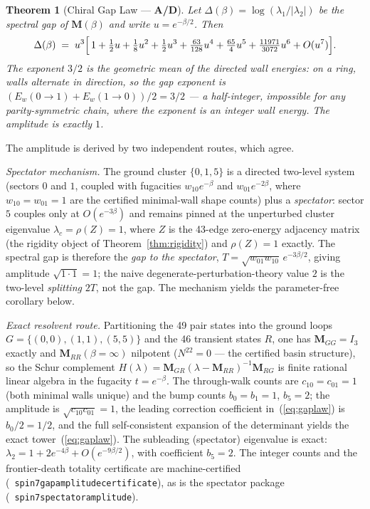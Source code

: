 \documentclass[11pt]{article}
\newtheorem{theorem}{Theorem}[section]
\theoremstyle{remark}
\newcommand{\lean}[1]{%
  \penalty-100
  \begingroup\def\_{\textunderscore\allowbreak}\texttt{#1}\endgroup}
\newcommand{\CatAD}{\textbf{A/D}}
\begin{document}
\begin{theorem}[Chiral Gap Law --- \CatAD{}]
\label{thm:gaplaw}
Let $\Delta(\beta) = \log(\lambda_1/|\lambda_2|)$ be the spectral gap of
$\mathbf{M}(\beta)$ and write $u = e^{-\beta/2}$. Then
\begin{equation}\label{eq:gaplaw}
  \Delta(\beta) \;=\; u^3 \Bigl[\, 1 + \tfrac{1}{2}u + \tfrac{1}{8}u^2
    + \tfrac{1}{2}u^3 + \tfrac{63}{128}u^4 + \tfrac{65}{4}u^5
    + \tfrac{11971}{3072}u^6 + O(u^7) \Bigr].
\end{equation}
The exponent $3/2$ is the geometric mean of the directed wall energies: on a
ring, walls alternate in direction, so the gap exponent is
$(E_w(0{\to}1) + E_w(1{\to}0))/2 = 3/2$ --- a half-integer, impossible for any
parity-symmetric chain, where the exponent is an integer wall energy. The
amplitude is exactly $1$.
\end{theorem}

The amplitude is derived by two independent routes, which agree.

\medskip
\noindent\emph{Spectator mechanism.}
The ground cluster $\{0, 1, 5\}$ is a directed two-level system (sectors $0$
and $1$, coupled with fugacities $w_{10}e^{-\beta}$ and $w_{01}e^{-2\beta}$,
where $w_{10} = w_{01} = 1$ are the certified minimal-wall shape counts) plus
a \emph{spectator}: sector $5$ couples only at $O(e^{-3\beta})$ and remains
pinned at the unperturbed cluster eigenvalue $\lambda_c = \rho(Z) = 1$, where
$Z$ is the 43-edge zero-energy adjacency matrix (the rigidity object of
Theorem~\ref{thm:rigidity}) and $\rho(Z) = 1$ exactly. The spectral gap is
therefore the \emph{gap to the spectator},
$T = \sqrt{w_{01} w_{10}}\, e^{-3\beta/2}$, giving amplitude
$\sqrt{1 \cdot 1} = 1$; the naive degenerate-perturbation-theory value $2$ is
the two-level \emph{splitting} $2T$, not the gap. The mechanism yields the
parameter-free corollary below.

\medskip
\noindent\emph{Exact resolvent route.}
Partitioning the 49 pair states into the ground loops
$G = \{(0,0), (1,1), (5,5)\}$ and the 46 transient states $R$, one has
$\mathbf{M}_{GG} = I_3$ exactly and $\mathbf{M}_{RR}(\beta{=}\infty)$
nilpotent ($N^{22} = 0$ --- the certified basin structure), so the Schur
complement $H(\lambda) = \mathbf{M}_{GR}(\lambda - \mathbf{M}_{RR})^{-1}
\mathbf{M}_{RG}$ is finite rational linear algebra in the fugacity
$t = e^{-\beta}$. The through-walk counts are $c_{10} = c_{01} = 1$ (both
minimal walls unique) and the bump counts $b_0 = b_1 = 1$, $b_5 = 2$; the
amplitude is $\sqrt{c_{10} c_{01}} = 1$, the leading correction coefficient
in~(\ref{eq:gaplaw}) is $b_0/2 = 1/2$, and the full self-consistent expansion
of the determinant yields the exact tower~(\ref{eq:gaplaw}). The subleading
(spectator) eigenvalue is exact:
$\lambda_2 = 1 + 2e^{-4\beta} + O(e^{-9\beta/2})$, with coefficient
$b_5 = 2$. The integer counts and the frontier-death totality certificate are
machine-certified \mbox{(\lean{spin7\_gap\_amplitude\_certificate})}, as is the
spectator package \mbox{(\lean{spin7\_spectator\_amplitude})}.
\end{document}
